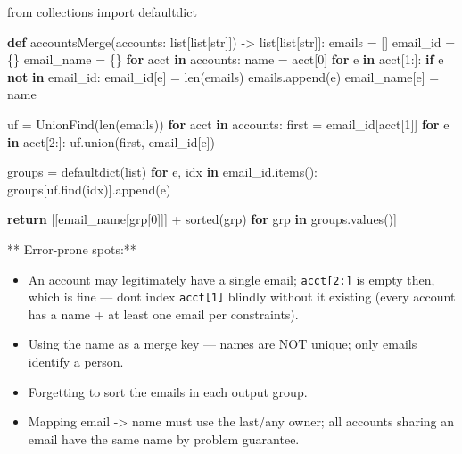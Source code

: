 \documentclass[11pt]{article}
\providecommand{\tightlist}{\setlength{\itemsep}{1pt}\setlength{\parskip}{0pt}}
\newenvironment{Shaded}{\begin{snugshade}}{\end{snugshade}}
\newcommand{\BuiltInTok}[1]{\textcolor[rgb]{0.50,0.55,0.55}{#1}}
\newcommand{\ControlFlowTok}[1]{\textcolor[rgb]{0.99,0.74,0.29}{\textbf{#1}}}
\newcommand{\DecValTok}[1]{\textcolor[rgb]{0.96,0.45,0.00}{#1}}
\newcommand{\ImportTok}[1]{\textcolor[rgb]{0.15,0.68,0.38}{#1}}
\newcommand{\KeywordTok}[1]{\textcolor[rgb]{0.81,0.81,0.76}{\textbf{#1}}}
\newcommand{\NormalTok}[1]{\textcolor[rgb]{0.81,0.81,0.76}{#1}}
\newcommand{\OperatorTok}[1]{\textcolor[rgb]{0.81,0.81,0.76}{#1}}
\begin{document}
\begin{Shaded}
\begin{Highlighting}[]
\ImportTok{from}\NormalTok{ collections }\ImportTok{import}\NormalTok{ defaultdict}

\KeywordTok{def}\NormalTok{ accountsMerge(accounts: }\BuiltInTok{list}\NormalTok{[}\BuiltInTok{list}\NormalTok{[}\BuiltInTok{str}\NormalTok{]]) }\OperatorTok{{-}\textgreater{}} \BuiltInTok{list}\NormalTok{[}\BuiltInTok{list}\NormalTok{[}\BuiltInTok{str}\NormalTok{]]:}
\NormalTok{    emails }\OperatorTok{=}\NormalTok{ []}
\NormalTok{    email\_id }\OperatorTok{=}\NormalTok{ \{\}}
\NormalTok{    email\_name }\OperatorTok{=}\NormalTok{ \{\}}
    \ControlFlowTok{for}\NormalTok{ acct }\KeywordTok{in}\NormalTok{ accounts:}
\NormalTok{        name }\OperatorTok{=}\NormalTok{ acct[}\DecValTok{0}\NormalTok{]}
        \ControlFlowTok{for}\NormalTok{ e }\KeywordTok{in}\NormalTok{ acct[}\DecValTok{1}\NormalTok{:]:}
            \ControlFlowTok{if}\NormalTok{ e }\KeywordTok{not} \KeywordTok{in}\NormalTok{ email\_id:}
\NormalTok{                email\_id[e] }\OperatorTok{=} \BuiltInTok{len}\NormalTok{(emails)}
\NormalTok{                emails.append(e)}
\NormalTok{            email\_name[e] }\OperatorTok{=}\NormalTok{ name}

\NormalTok{    uf }\OperatorTok{=}\NormalTok{ UnionFind(}\BuiltInTok{len}\NormalTok{(emails))}
    \ControlFlowTok{for}\NormalTok{ acct }\KeywordTok{in}\NormalTok{ accounts:}
\NormalTok{        first }\OperatorTok{=}\NormalTok{ email\_id[acct[}\DecValTok{1}\NormalTok{]]}
        \ControlFlowTok{for}\NormalTok{ e }\KeywordTok{in}\NormalTok{ acct[}\DecValTok{2}\NormalTok{:]:}
\NormalTok{            uf.union(first, email\_id[e])}

\NormalTok{    groups }\OperatorTok{=}\NormalTok{ defaultdict(}\BuiltInTok{list}\NormalTok{)}
    \ControlFlowTok{for}\NormalTok{ e, idx }\KeywordTok{in}\NormalTok{ email\_id.items():}
\NormalTok{        groups[uf.find(idx)].append(e)}

    \ControlFlowTok{return}\NormalTok{ [[email\_name[grp[}\DecValTok{0}\NormalTok{]]] }\OperatorTok{+} \BuiltInTok{sorted}\NormalTok{(grp) }\ControlFlowTok{for}\NormalTok{ grp }\KeywordTok{in}\NormalTok{ groups.values()]}
\end{Highlighting}
\end{Shaded}

** Error-prone spots:**

\begin{itemize}
\tightlist
\item
  An account may legitimately have a single email; \texttt{acct{[}2:{]}} is empty then, which is fine --- don\textquotesingle t index \texttt{acct{[}1{]}} blindly without it existing (every account has a name + at least one email per constraints).
\item
  Using the name as a merge key --- names are NOT unique; only emails identify a person.
\item
  Forgetting to sort the emails in each output group.
\item
  Mapping email -\textgreater{} name must use the last/any owner; all accounts sharing an email have the same name by problem guarantee.
\end{itemize}
\end{document}
